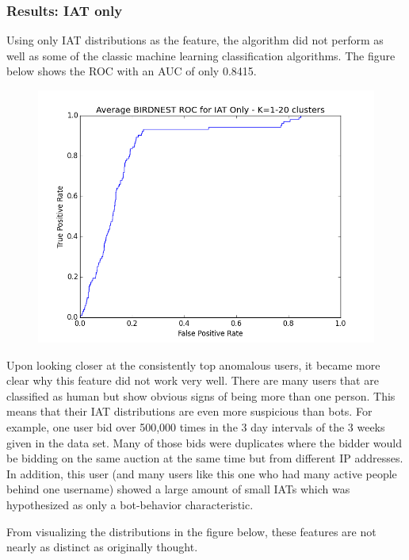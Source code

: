 \documentclass{article} %
\begin{document}
\subsubsection{Results: IAT only}

Using only IAT distributions as the feature, the algorithm did not perform as well as some of the classic machine learning classification algorithms.
The figure below shows the ROC with an AUC of only 0.8415.

\begin{figure}[h]
\centering
{\includegraphics[scale=0.47]{img/bird_iat_roc.png}}
\end{figure}

Upon looking closer at the consistently top anomalous users, it became more clear why this feature did not work very well.
There are many users that are classified as human but show obvious signs of being more than one person.
This means that their IAT distributions are even more suspicious than bots.
For example, one user bid over 500,000 times in the 3 day intervals of the 3 weeks given in the data set.
Many of those bids were duplicates where the bidder would be bidding on the same auction at the same time but from different IP addresses.
In addition, this user (and many users like this one who had many active people behind one username) showed a large amount of small IATs which was hypothesized as only a bot-behavior characteristic.

From visualizing the distributions in the figure below, these features are not nearly as distinct as originally thought.

\clearpage
\end{document}
